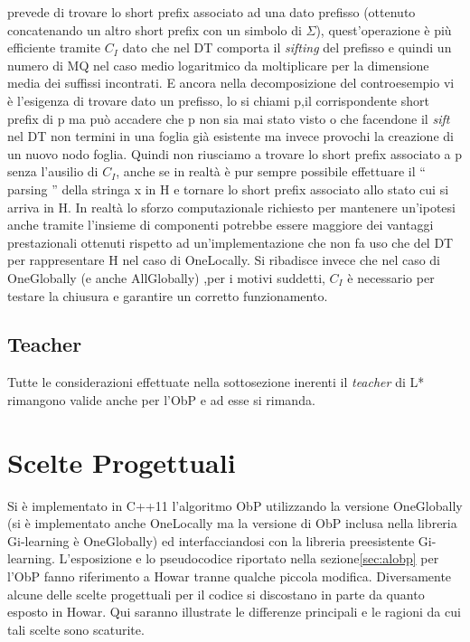 prevede di trovare lo short prefix associato ad una dato prefisso (ottenuto concatenando un altro short prefix con un simbolo di $\Sigma$), quest'operazione è più efficiente tramite $C_{I}$ dato che nel \ac{DT} comporta il \textit{sifting} del prefisso e quindi un numero di \ac{MQ} nel caso medio logaritmico  da moltiplicare per la dimensione media dei suffissi incontrati. E ancora nella decomposizione del controesempio vi è l'esigenza di trovare dato un prefisso, lo si chiami p,il corrispondente short prefix di p ma può accadere che p non sia mai stato visto o che facendone il \textit{sift} nel \ac{DT} non termini in una foglia già esistente ma invece provochi la creazione di un nuovo nodo foglia. Quindi non riusciamo a trovare lo short prefix associato a p senza l'ausilio di $C_I$, anche se in realtà è pur sempre possibile effettuare il  `` parsing  '' della stringa x in \ac{H} e tornare lo short prefix associato allo stato cui si arriva in \ac{H}. In realtà lo sforzo computazionale richiesto per mantenere un'ipotesi anche tramite l'insieme di componenti potrebbe essere maggiore dei vantaggi prestazionali ottenuti rispetto ad un'implementazione che non fa uso che del \ac{DT} per rappresentare \ac{H} nel caso di OneLocally. Si ribadisce invece che nel caso di OneGlobally  (e anche AllGlobally) ,per i motivi suddetti, $C_I$ è necessario per testare la chiusura e garantire un corretto funzionamento.
\subsection{Teacher} Tutte le considerazioni effettuate nella sottosezione \label{sub:tea} inerenti il \textit{teacher} di L* rimangono valide anche per l'\ac{ObP} e ad esse si rimanda.  
 
\section{Scelte Progettuali} Si è implementato in C++11 l'algoritmo \ac{ObP} utilizzando la versione OneGlobally (si è implementato anche OneLocally ma la versione di \ac{ObP} inclusa nella libreria Gi-learning è OneGlobally) ed interfacciandosi con la libreria preesistente Gi-learning. L'esposizione e lo pseudocodice riportato nella sezione\ref{sec:alobp} per l'\ac{ObP} fanno riferimento a Howar \cite{Howar12} tranne qualche piccola modifica. Diversamente alcune delle scelte   progettuali per il codice  si discostano in parte da quanto esposto in Howar. Qui saranno illustrate le differenze principali e le ragioni da cui tali scelte sono scaturite.

